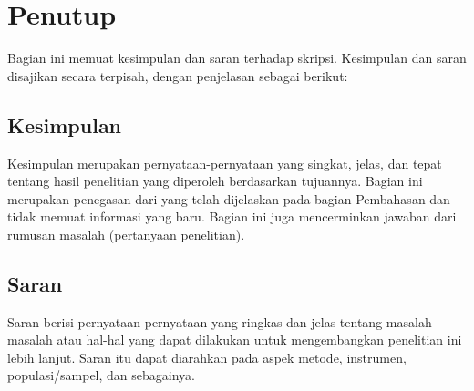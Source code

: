 
\newpage
\chapter{Penutup}

Bagian ini memuat kesimpulan dan saran terhadap skripsi. Kesimpulan dan saran disajikan secara terpisah, dengan penjelasan sebagai berikut: 

\section{Kesimpulan}

Kesimpulan merupakan pernyataan-pernyataan yang singkat, jelas, dan tepat tentang hasil penelitian yang diperoleh berdasarkan tujuannya. Bagian ini merupakan penegasan dari yang telah dijelaskan pada bagian Pembahasan dan tidak memuat informasi yang baru. Bagian ini juga mencerminkan jawaban dari rumusan masalah (pertanyaan penelitian).

\section{Saran}

Saran berisi pernyataan-pernyataan yang ringkas dan jelas tentang masalah-masalah atau hal-hal yang dapat dilakukan untuk mengembangkan penelitian ini lebih lanjut. Saran itu dapat diarahkan pada aspek metode, instrumen, populasi/sampel, dan sebagainya.
